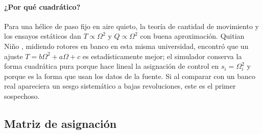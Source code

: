 \paragraph{¿Por qué cuadrático?} Para una hélice de paso fijo en aire
quieto, la teoría de cantidad de movimiento y los ensayos estáticos dan
$T\propto\Omega^2$ y $Q\propto\Omega^2$ con buena aproximación. Quitian Niño
\cite{quitian22}, midiendo rotores en banco en esta misma universidad,
encontró que un ajuste $T=b\Omega^2+a\Omega+c$ es estadísticamente mejor;
el simulador conserva la forma cuadrática pura porque hace lineal la
asignación de control en $s_i=\Omega_i^2$ y porque es la forma que usan los
datos de la fuente. Si al comparar con un banco real apareciera un sesgo
sistemático a bajas revoluciones, este es el primer sospechoso.

\subsection{Matriz de asignación}

